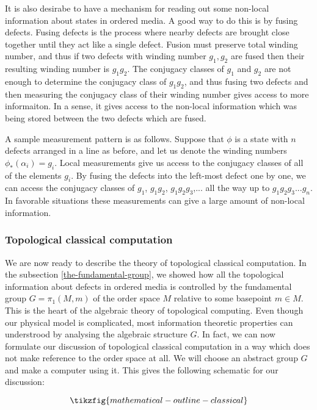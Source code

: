 It is also desirabe to have a mechanism for reading out some non-local information about states in ordered media. A good way to do this is by fusing defects. Fusing defects is the process where nearby defects are brought close together until they act like a single defect. Fusion must preserve total winding number, and thus if two defects with winding number $g_1,g_2$ are fused then their resulting winding number is $g_1g_2$. The conjugacy classes of $g_1$ and $g_2$ are not enough to determine the conjugacy class of $g_1g_2$, and thus fusing two defects and then measuring the conjugacy class of their winding number gives access to more informaiton. In a sense, it gives access to the non-local information which was being stored between the two defects which are fused.

A sample measurement pattern is as follows.  Suppose that $\phi$ is a state with $n$ defects arranged in a line as before, and let us denote the winding numbers $\phi_*(\alpha_i)=g_i$. Local measurements give us access to the conjugacy classes of all of the elements $g_i$. By fusing the defects into the left-most defect one by one, we can access the conjugacy classes of $g_1$, $g_1g_2$,  $g_1g_2g_3$,... all the way up to $g_1g_2g_3...g_n$. In favorable situations these measurements can give a large amount of non-local information.

\subsubsection{Topological classical computation}

We are now ready to describe the theory of topological classical computation. In the subsection \ref{the-fundamental-group}, we showed how all the topological information about defects in ordered media is controlled by the fundamental group $G=\pi_1(M,m)$ of the order space $M$ relative to some basepoint $m\in M$. This is the heart of the algebraic theory of topological computing. Even though our physical model is complicated, most information theoretic properties can understrood by analysing the algebraic structure $G$. In fact, we can now formulate our discussion of topological classical computation in a way which does not make reference to the order space at all. We will choose an abstract group $G$ and make a computer using it. This gives the following schematic for our discussion:

\begin{equation*}
\tikzfig{mathematical-outline-classical}
\end{equation*}

